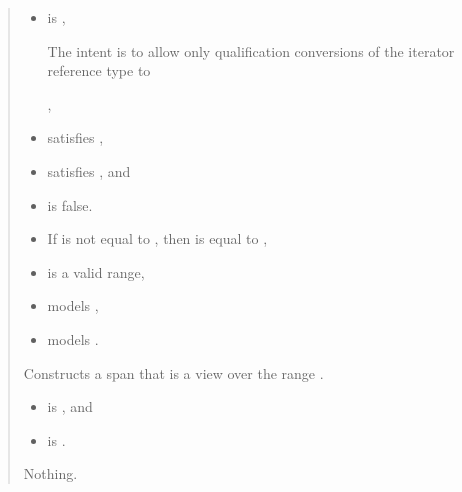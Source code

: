\documentclass{wg21}
\begin{document}
\begin{quote}
\begin{addedblock}

\begin{itemdescr}
	 \pnum
	\constraints
	\begin{itemize}
		\item {} is ,
		\begin{note}The intent is to allow only qualification conversions of the iterator reference type to  \end{note},
		\item {} satisfies ,
		\item {} satisfies , and
		\item {} is false.
	\end{itemize}

    \expects
    \begin{itemize}
    \item
    If  is not equal to ,
    then  is equal to ,
    \item {} is a valid range,
    \item {} models ,
    \item {} models .
    \end{itemize}

    \pnum
    \effects
    Constructs a span that is a view over the range .

    \pnum
    \ensures
    
    \begin{itemize}
    	\item {} is , and
    	\item {} is .
    \end{itemize}
   
    \pnum
    \throws
    Nothing.


\end{itemdescr}
\end{addedblock}


\end{quote}
\end{document}
